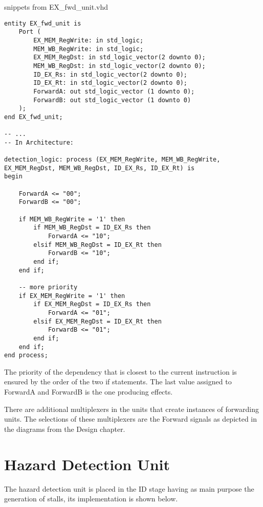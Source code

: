 \documentclass[a4paper,12pt]{report}
\begin{document}
\begin{my-listing}{snippets from EX\_fwd\_unit.vhd}
    \begin{lstlisting}[style=vhdl]
entity EX_fwd_unit is
    Port (
        EX_MEM_RegWrite: in std_logic;
        MEM_WB_RegWrite: in std_logic;
        EX_MEM_RegDst: in std_logic_vector(2 downto 0);
        MEM_WB_RegDst: in std_logic_vector(2 downto 0);
        ID_EX_Rs: in std_logic_vector(2 downto 0);
        ID_EX_Rt: in std_logic_vector(2 downto 0);
        ForwardA: out std_logic_vector (1 downto 0);
        ForwardB: out std_logic_vector (1 downto 0)
    );
end EX_fwd_unit;

-- ... 
-- In Architecture:

detection_logic: process (EX_MEM_RegWrite, MEM_WB_RegWrite, EX_MEM_RegDst, MEM_WB_RegDst, ID_EX_Rs, ID_EX_Rt) is
begin
        
    ForwardA <= "00";
    ForwardB <= "00";
            
    if MEM_WB_RegWrite = '1' then 
        if MEM_WB_RegDst = ID_EX_Rs then 
            ForwardA <= "10";
        elsif MEM_WB_RegDst = ID_EX_Rt then
            ForwardB <= "10";
        end if;
    end if;
    
    -- more priority
    if EX_MEM_RegWrite = '1' then 
        if EX_MEM_RegDst = ID_EX_Rs then
            ForwardA <= "01";
        elsif EX_MEM_RegDst = ID_EX_Rt then
            ForwardB <= "01";   
        end if;
    end if;        
end process;
    \end{lstlisting}
\end{my-listing}

The priority of the dependency that is closest to the current instruction is ensured by the order of the two if statements. The last value assigned to ForwardA and ForwardB is the one producing effects.

There are additional multiplexers in the units that create instances of forwarding units. The selections of these multiplexers are the Forward signals as depicted in the diagrams from the Design chapter.

\section{Hazard Detection Unit}

The hazard detection unit is placed in the ID stage having as main purpose the generation of stalls, its implementation is shown below.
\end{document}

